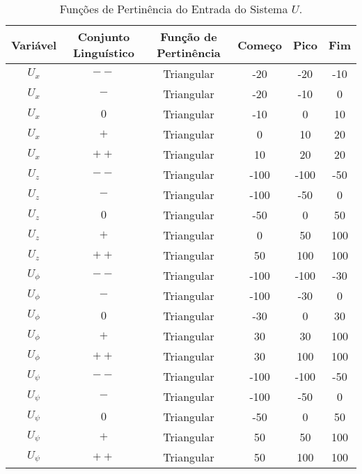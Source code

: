 \begin{table}[h!]
\centering
\begin{tabular}{|c|c|c|c|c|c|}
    \hline
    Variável & Conjunto Linguístico & Função de Pertinência & Começo & Pico & Fim \\
    \hline
    $U_x$ & $--$ & Triangular & -20 & -20 & -10 \\
    $U_x$ & $-$  & Triangular & -20 & -10 & 0 \\
    $U_x$ & $0$  & Triangular & -10 & 0 & 10 \\
    $U_x$ & $+$  & Triangular & 0 & 10 & 20 \\
    $U_x$ & $++$ & Triangular & 10 & 20 & 20 \\
    \hline
    $U_{z}$ & $--$ & Triangular & -100 & -100 & -50 \\
    $U_{z}$ & $-$  & Triangular & -100 & -50 & 0 \\
    $U_{z}$ & $0$  & Triangular & -50 & 0 & 50 \\
    $U_{z}$ & $+$  & Triangular & 0 & 50 & 100 \\
    $U_{z}$ & $++$ & Triangular & 50 & 100 & 100 \\
    \hline
    $U_{\phi}$ & $--$ & Triangular & -100 & -100 & -30 \\
    $U_{\phi}$ & $-$  & Triangular & -100 & -30 & 0 \\
    $U_{\phi}$ & $0$  & Triangular & -30 & 0 & 30 \\
    $U_{\phi}$ & $+$  & Triangular & 30 & 30 & 100 \\
    $U_{\phi}$ & $++$ & Triangular & 30 & 100 & 100 \\
    \hline
    $U_{\psi}$ & $--$ & Triangular & -100 & -100 & -50 \\
    $U_{\psi}$ & $-$  & Triangular & -100 & -50 & 0 \\
    $U_{\psi}$ & $0$  & Triangular & -50 & 0 & 50 \\
    $U_{\psi}$ & $+$  & Triangular & 50 & 50 & 100 \\
    $U_{\psi}$ & $++$ & Triangular & 50 & 100 & 100 \\
    \hline
\end{tabular}
\caption{Funções de Pertinência do Entrada do Sistema $U$.}
\label{tab:fuzzy_error}
\end{table}